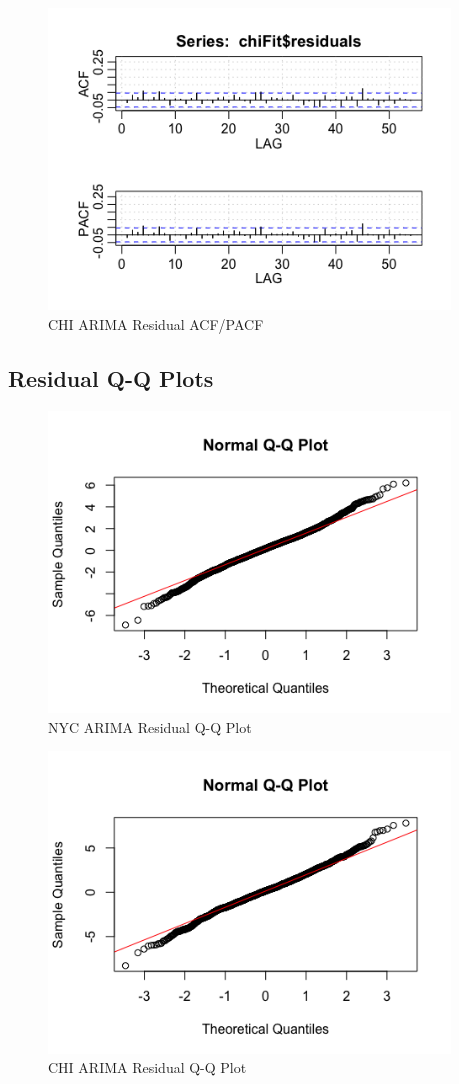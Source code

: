 \documentclass[12pt]{article}
\begin{document}
\begin{figure}[H]
    \includegraphics[width=\textwidth, height=8cm]{Figures/chiResACF.png}
    \caption{CHI ARIMA Residual ACF/PACF}
\end{figure}


\subsection{Residual Q-Q Plots} \label{arimaQQ}
\begin{figure}[H]
    \includegraphics[width=\textwidth, height=8cm]{Figures/nycRes.png}
    \caption{NYC ARIMA Residual Q-Q Plot}
\end{figure}

\begin{figure}[H]
    \includegraphics[width=\textwidth, height=8cm]{Figures/chiRes.png}
    \caption{CHI ARIMA Residual Q-Q Plot}
\end{figure}
\end{document}
